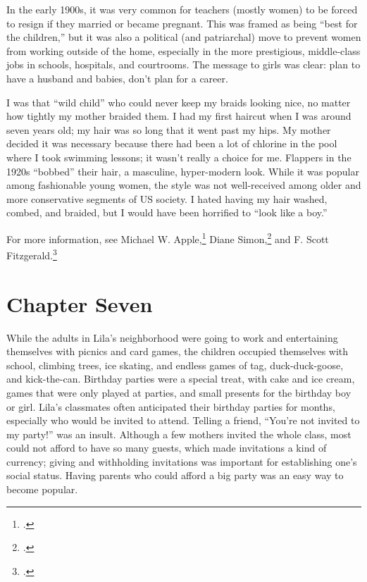 \documentclass[
  american,
  letterpaper,
]{book}
\begin{document}
In the early 1900s, it was very common for teachers (mostly women) to be
forced to resign if they married or became pregnant. This was framed as
being ``best for the children,'' but it was also a political (and
patriarchal) move to prevent women from working outside of the home,
especially in the more prestigious, middle-class jobs in schools,
hospitals, and courtrooms. The message to girls was clear: plan to have
a husband and babies, don't plan for a career.

I was that ``wild child'' who could never keep my braids looking nice,
no matter how tightly my mother braided them. I had my first haircut
when I was around seven years old; my hair was so long that it went past
my hips. My mother decided it was necessary because there had been a lot
of chlorine in the pool where I took swimming lessons; it wasn't really
a choice for me. Flappers in the 1920s ``bobbed'' their hair, a
masculine, hyper-modern look. While it was popular among fashionable
young women, the style was not well-received among older and more
conservative segments of US society. I hated having my hair washed,
combed, and braided, but I would have been horrified to ``look like a
boy.''

For more information, see Michael W. Apple,\footnote{.} Diane Simon,\footnote{.} and F. Scott Fitzgerald.\footnote{.}


\chapter{Chapter Seven}\label{chapter-seven}

While the adults in Lila's neighborhood were going to work and
entertaining themselves with picnics and card games, the children
occupied themselves with school, climbing trees, ice skating, and
endless games of tag, duck-duck-goose, and kick-the-can. Birthday
parties were a special treat, with cake and ice cream, games that were
only played at parties, and small presents for the birthday boy or girl.
Lila's classmates often anticipated their birthday parties for months,
especially who would be invited to attend. Telling a friend, ``You're
not invited to my party!'' was an insult. Although a few mothers invited
the whole class, most could not afford to have so many guests, which
made invitations a kind of currency; giving and withholding invitations
was important for establishing one's social status. Having parents who
could afford a big party was an easy way to become popular.
\end{document}
